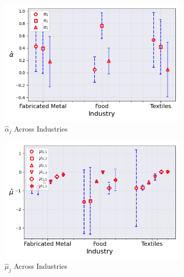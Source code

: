 \documentclass{article}
\begin{document}
\begin{figure}[ht!]
    \centering 
    \caption{AR(1) Mixture Model Across Industries ($\hat{M}_0 = 3$)}
    \begin{subfigure}[t]{0.32\textwidth}
        \centering
        \includegraphics[width=\textwidth]{figure/ar1_mixture_alpha_across_industries_m3.png}
        \caption{$\hat\alpha_j$ Across Industries}
    \end{subfigure}
    \begin{subfigure}[t]{0.32\textwidth}
        \centering
        \includegraphics[width=\textwidth]{figure/ar1_mixture_mu_across_industries_m3.png}
        \caption{$\hat\mu_j$ Across Industries}
    \end{subfigure}
    \begin{subfigure}[t]{0.32\textwidth}
        \centering

\end{subfigure}
\end{figure}
\end{document}
